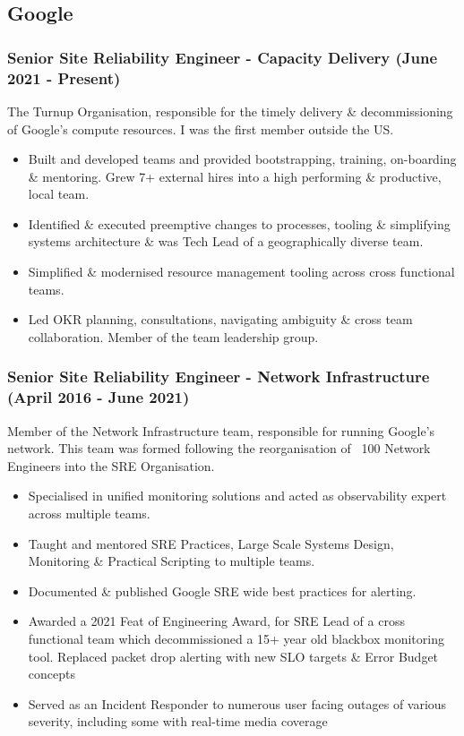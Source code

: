\documentclass[a4paper, 10pt] {article}
\begin{document}
\subsection*{Google}

\subsubsection*{Senior Site Reliability Engineer - Capacity Delivery (June 2021 - Present)}

The Turnup Organisation, responsible for the timely delivery \&
decommissioning of Google's compute resources. I was the first member
outside the US.

\begin{itemize}[noitemsep]
\item Built and developed teams and provided bootstrapping, training, 
on-boarding \& mentoring. Grew 7+ external hires into a high performing \&
productive, local team.
\item Identified \& executed preemptive changes to processes, tooling \& simplifying systems
architecture \& was Tech Lead of a geographically diverse team.
\item Simplified \& modernised resource management tooling across cross functional teams.
\item Led OKR planning, consultations, navigating ambiguity \& cross team collaboration. Member
of the team leadership group.
\end{itemize}

\subsubsection*{Senior Site Reliability Engineer - Network Infrastructure (April 2016 - June 2021)}

Member of the Network Infrastructure team, responsible for running
Google's network. This team was formed following the reorganisation of
~100 Network Engineers into the SRE Organisation.

\begin{itemize}[noitemsep]
	\item Specialised in unified monitoring solutions and acted as observability expert across multiple teams.
	\item Taught and mentored SRE Practices, Large Scale Systems Design, Monitoring \& Practical Scripting to multiple teams.
	\item Documented \& published Google SRE wide best practices for alerting.
	\item Awarded a 2021 Feat of Engineering Award, for SRE Lead of a cross functional team which decommissioned a 15+ year old blackbox
		monitoring tool. Replaced packet drop alerting with new SLO targets \& Error Budget concepts
	\item Served as an Incident Responder to numerous user facing outages of various severity, including some with real-time media coverage
\end{itemize}
\end{document}
